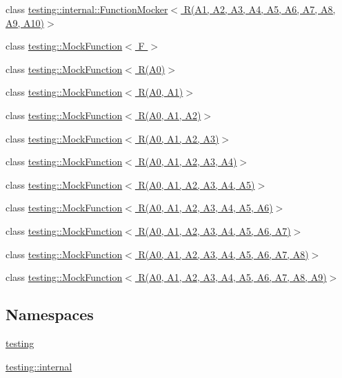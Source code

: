\begin{DoxyCompactItemize}
\item 
class \hyperlink{classtesting_1_1internal_1_1FunctionMocker_3_01R_07A1_00_01A2_00_01A3_00_01A4_00_01A5_00_01A6_0079295c90ba14a714e84d5a856a5b50dd}{testing\+::internal\+::\+Function\+Mocker$<$ R(\+A1, A2, A3, A4, A5, A6, A7, A8, A9, A10)$>$}
\item 
class \hyperlink{classtesting_1_1MockFunction}{testing\+::\+Mock\+Function$<$ F $>$}
\item 
class \hyperlink{classtesting_1_1MockFunction_3_01R_07A0_08_4}{testing\+::\+Mock\+Function$<$ R(\+A0)$>$}
\item 
class \hyperlink{classtesting_1_1MockFunction_3_01R_07A0_00_01A1_08_4}{testing\+::\+Mock\+Function$<$ R(\+A0, A1)$>$}
\item 
class \hyperlink{classtesting_1_1MockFunction_3_01R_07A0_00_01A1_00_01A2_08_4}{testing\+::\+Mock\+Function$<$ R(\+A0, A1, A2)$>$}
\item 
class \hyperlink{classtesting_1_1MockFunction_3_01R_07A0_00_01A1_00_01A2_00_01A3_08_4}{testing\+::\+Mock\+Function$<$ R(\+A0, A1, A2, A3)$>$}
\item 
class \hyperlink{classtesting_1_1MockFunction_3_01R_07A0_00_01A1_00_01A2_00_01A3_00_01A4_08_4}{testing\+::\+Mock\+Function$<$ R(\+A0, A1, A2, A3, A4)$>$}
\item 
class \hyperlink{classtesting_1_1MockFunction_3_01R_07A0_00_01A1_00_01A2_00_01A3_00_01A4_00_01A5_08_4}{testing\+::\+Mock\+Function$<$ R(\+A0, A1, A2, A3, A4, A5)$>$}
\item 
class \hyperlink{classtesting_1_1MockFunction_3_01R_07A0_00_01A1_00_01A2_00_01A3_00_01A4_00_01A5_00_01A6_08_4}{testing\+::\+Mock\+Function$<$ R(\+A0, A1, A2, A3, A4, A5, A6)$>$}
\item 
class \hyperlink{classtesting_1_1MockFunction_3_01R_07A0_00_01A1_00_01A2_00_01A3_00_01A4_00_01A5_00_01A6_00_01A7_08_4}{testing\+::\+Mock\+Function$<$ R(\+A0, A1, A2, A3, A4, A5, A6, A7)$>$}
\item 
class \hyperlink{classtesting_1_1MockFunction_3_01R_07A0_00_01A1_00_01A2_00_01A3_00_01A4_00_01A5_00_01A6_00_01A7_00_01A8_08_4}{testing\+::\+Mock\+Function$<$ R(\+A0, A1, A2, A3, A4, A5, A6, A7, A8)$>$}
\item 
class \hyperlink{classtesting_1_1MockFunction_3_01R_07A0_00_01A1_00_01A2_00_01A3_00_01A4_00_01A5_00_01A6_00_01A7_00_01A8_00_01A9_08_4}{testing\+::\+Mock\+Function$<$ R(\+A0, A1, A2, A3, A4, A5, A6, A7, A8, A9)$>$}
\end{DoxyCompactItemize}
\subsection*{Namespaces}
\begin{DoxyCompactItemize}
\item 
 \hyperlink{namespacetesting}{testing}
\item 
 \hyperlink{namespacetesting_1_1internal}{testing\+::internal}
\end{DoxyCompactItemize}
